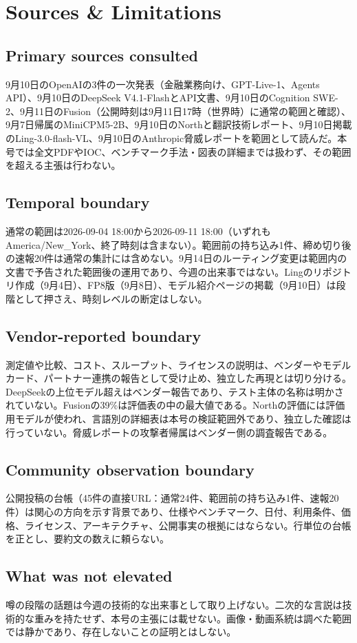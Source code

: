\section*{Sources \& Limitations}

\subsection*{Primary sources consulted}
9月10日のOpenAIの3件の一次発表（金融業務向け、GPT-Live-1、Agents API）、9月10日のDeepSeek V4.1-FlashとAPI文書、9月10日のCognition SWE-2、9月11日のFusion（公開時刻は9月11日17時（世界時）に通常の範囲と確認）、9月7日帰属のMiniCPM5-2B、9月10日のNorthと翻訳技術レポート、9月10日掲載のLing-3.0-flash-VL、9月10日のAnthropic脅威レポートを範囲として読んだ。本号では全文PDFやIOC、ベンチマーク手法・図表の詳細までは扱わず、その範囲を超える主張は行わない。

\subsection*{Temporal boundary}
通常の範囲は2026-09-04 18:00から2026-09-11 18:00（いずれもAmerica/New\_York、終了時刻は含まない）。範囲前の持ち込み1件、締め切り後の速報20件は通常の集計には含めない。9月14日のルーティング変更は範囲内の文書で予告された範囲後の運用であり、今週の出来事ではない。Lingのリポジトリ作成（9月4日）、FP8版（9月8日）、モデル紹介ページの掲載（9月10日）は段階として押さえ、時刻レベルの断定はしない。

\subsection*{Vendor-reported boundary}
測定値や比較、コスト、スループット、ライセンスの説明は、ベンダーやモデルカード、パートナー連携の報告として受け止め、独立した再現とは切り分ける。DeepSeekの上位モデル超えはベンダー報告であり、テスト主体の名称は明かされていない。Fusionの39\%は評価表の中の最大値である。Northの評価には評価用モデルが使われ、言語別の詳細表は本号の検証範囲外であり、独立した確認は行っていない。脅威レポートの攻撃者帰属はベンダー側の調査報告である。

\subsection*{Community observation boundary}
公開投稿の台帳（45件の直接URL：通常24件、範囲前の持ち込み1件、速報20件）は関心の方向を示す背景であり、仕様やベンチマーク、日付、利用条件、価格、ライセンス、アーキテクチャ、公開事実の根拠にはならない。行単位の台帳を正とし、要約文の数えに頼らない。

\subsection*{What was not elevated}
噂の段階の話題は今週の技術的な出来事として取り上げない。二次的な言説は技術的な重みを持たせず、本号の主張には載せない。画像・動画系統は調べた範囲では静かであり、存在しないことの証明とはしない。
